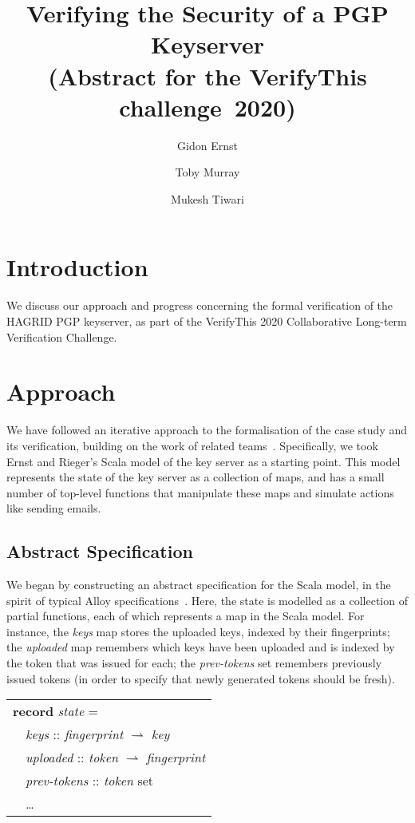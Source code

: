 \documentclass{llncs}
\title{Verifying the Security of a PGP Keyserver \\
       (Abstract for the VerifyThis challenge~2020)}
\author{Gidon Ernst \inst{1} \and Toby Murray \inst{2} \and Mukesh Tiwari \inst{2}}
\institute{LMU Munich, \email{gidon.ernst@lmu.de} \and
  University of Melbourne, Australia, \email{firstname.lastname@unimelb.edu.au}}
\begin{document}
\maketitle

\section{Introduction}

We discuss our approach and progress concerning the formal verification of
the HAGRID PGP keyserver, as part of the VerifyThis 2020 Collaborative
Long-term Verification Challenge.

\section{Approach}

We have followed an iterative approach to the formalisation of the case study
and its verification, building on the work of related
teams~\cite{Ernst_Rieger_20}. Specifically, we took Ernst and Rieger's
Scala model of the key server as a starting point. This model represents
the state of the key server as a collection of maps, and has a small
number of top-level functions that manipulate these maps and simulate
actions like sending emails.

\subsection{Abstract Specification}
We began by constructing an abstract specification for the Scala model,
in the spirit of typical Alloy specifications~\cite{jackson2012software}.
Here, the state is modelled as a collection of partial functions, each of
which represents a map in the Scala model. For instance, the \emph{keys}
map stores the uploaded keys, indexed by their fingerprints; the
\emph{uploaded} map remembers which keys have been uploaded and is
indexed by the token that was issued for each; the \emph{prev-tokens} set
remembers previously issued tokens (in order to specify that newly generated
tokens should be fresh).

\medskip
\noindent\begin{tabular}{l}
\textbf{record} \emph{state} = \\
\ \ \emph{keys} :: \emph{fingerprint} $\rightharpoonup$ \emph{key} \\
\ \ \emph{uploaded} :: \emph{token} $\rightharpoonup$ \emph{fingerprint} \\
\ \ \emph{prev-tokens} :: \emph{token} set\\
\ \ \ldots
\end{tabular}
\medskip
\end{document}
